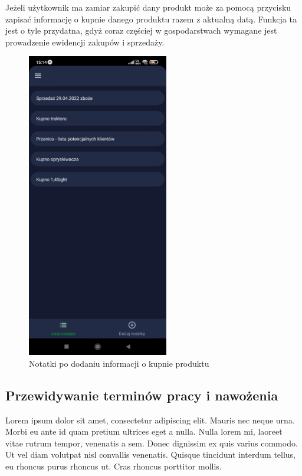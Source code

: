 \documentclass[a4paper,12pt,oneside]{book}
\begin{document}
		\newpage
		
		Jeżeli użytkownik ma zamiar zakupić dany produkt może za pomocą przycisku zapisać informację o kupnie danego produktu razem z aktualną datą. Funkcja ta jest o tyle przydatna, gdyż coraz częściej w gospodarstwach wymagane jest prowadzenie ewidencji zakupów i sprzedaży.
		
		\begin{figure}[H]
			\centering
			\includegraphics[width=0.55\textwidth]{grafika/wysz_c.jpg}
			\caption{Notatki po dodaniu informacji o kupnie produktu}
		\end{figure}
	
	\subsection{Przewidywanie terminów pracy i nawożenia}
		Lorem ipsum dolor sit amet, consectetur adipiscing elit. Mauris nec neque urna. Morbi eu ante id quam pretium ultrices eget a nulla. Nulla lorem mi, laoreet vitae rutrum tempor, venenatis a sem. Donec dignissim ex quis varius commodo. Ut vel diam volutpat nisl convallis venenatis. Quisque tincidunt interdum tellus, eu rhoncus purus rhoncus ut. Cras rhoncus porttitor mollis.
	
\end{document}
